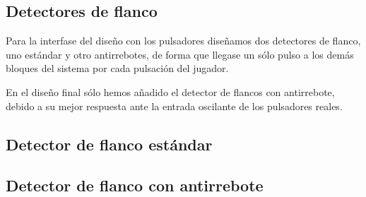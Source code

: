 \subsection{Detectores de flanco}
\label{edgeDetectors}

Para la interfase del diseño con los pulsadores diseñamos dos detectores de flanco, uno estándar y otro antirrebotes, de forma que llegase un sólo pulso a los demás bloques del sistema por cada pulsación del jugador.

En el diseño final sólo hemos añadido el detector de flancos con antirrebote, debido a su mejor respuesta ante la entrada oscilante de los pulsadores reales.

\subsection{Detector de flanco estándar}
\label{edgeDetectorStd}

\subsection{Detector de flanco con antirrebote}
\label{edgeDetectorDebounce}